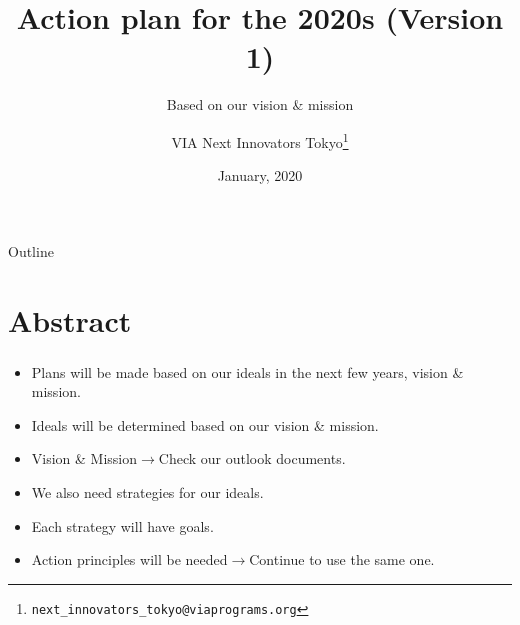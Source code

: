 \documentclass[dvipdfmx,10pt]{beamer}
\title{Action plan for the 2020s (Version 1)}
\subtitle{Based on our vision \& mission}
\author[VIA Next Innovators Tokyo]{VIA Next Innovators Tokyo\footnote{\texttt{next\_innovators\_tokyo@viaprograms.org}}}
\date[Jan., 2020]{January, 2020}
\newcommand{\ft}{\frametitle}
\begin{document}
\begin{frame}
\titlepage
\end{frame}
\begin{frame}{Outline}
  \setcounter{tocdepth}{3}  
  \tableofcontents[
    sectionstyle=show,
    subsectionstyle=show/show,
    subsubsectionstyle=show/show/show
    ]
\end{frame}
\section{Abstract}
\begin{frame}\ft{\insertsection}
\begin{itemize}
\item Plans will be made based on our ideals in the next few years, vision \& mission.
\item Ideals will be determined based on our vision \& mission.
\item Vision \& Mission$\to$Check our outlook documents.
\item We also need strategies for our ideals.
\item Each strategy will have goals.
\item Action principles will be needed$\to$Continue to use the same one. 
\end{itemize}
\end{frame}
\end{document}
